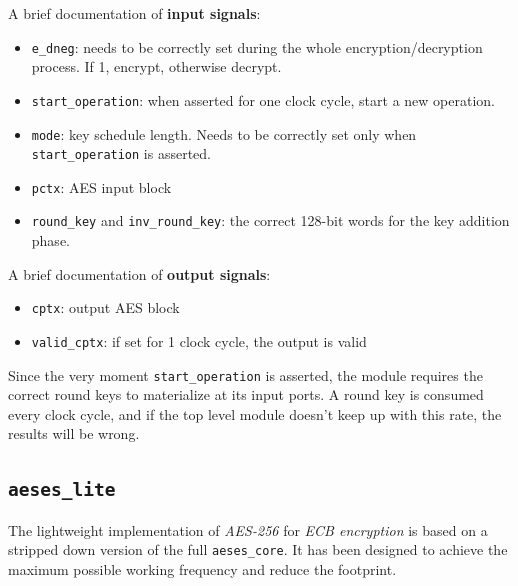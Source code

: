A brief documentation of \textbf{input signals}:
\begin{itemize}
	\item \texttt{e\_dneg}: needs to be correctly set during the whole encryption/decryption process.
If 1, encrypt, otherwise decrypt.
	\item \texttt{start\_operation}: when asserted for one clock cycle, start a new operation.
	\item \texttt{mode}: key schedule length. Needs to be correctly set only when \texttt{start\_operation}
is asserted.
	\item \texttt{pctx}: AES input block
	\item \texttt{round\_key} and \texttt{inv\_round\_key}: the correct 128-bit words for the
key addition phase.

\end{itemize}

A brief documentation of \textbf{output signals}:
\begin{itemize}
	\item \texttt{cptx}: output AES block
	\item \texttt{valid\_cptx}: if set for 1 clock cycle, the output is valid
\end{itemize}

Since the very moment \texttt{start\_operation} is asserted, the module requires
the correct round keys to materialize at its input ports. A round key is consumed
every clock cycle, and if the top level module doesn't keep up with this rate, the
results will be wrong.

\subsection{\texttt{\textbf{aeses\_lite}}}

The lightweight implementation of \textit{AES-256} for \textit{ECB encryption} is based
on a stripped down version of the full \texttt{aeses\_core}. It has been designed
to achieve the maximum possible working frequency and reduce the footprint.
